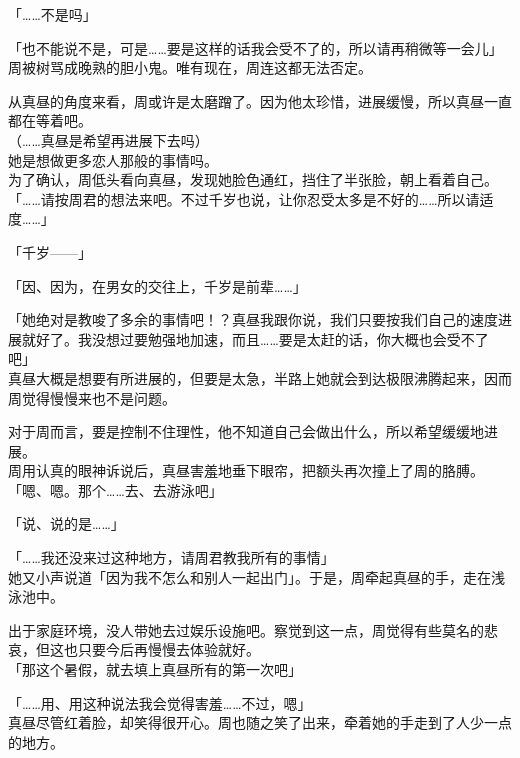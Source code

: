 「……不是吗」

「也不能说不是，可是……要是这样的话我会受不了的，所以请再稍微等一会儿」\\

周被树骂成晚熟的胆小鬼。唯有现在，周连这都无法否定。

从真昼的角度来看，周或许是太磨蹭了。因为他太珍惜，进展缓慢，所以真昼一直都在等着吧。\\

（……真昼是希望再进展下去吗）\\

她是想做更多恋人那般的事情吗。\\

为了确认，周低头看向真昼，发现她脸色通红，挡住了半张脸，朝上看着自己。\\

「……请按周君的想法来吧。不过千岁也说，让你忍受太多是不好的……所以请适度……」

「千岁——」

「因、因为，在男女的交往上，千岁是前辈……」

「她绝对是教唆了多余的事情吧！？真昼我跟你说，我们只要按我们自己的速度进展就好了。我没想过要勉强地加速，而且……要是太赶的话，你大概也会受不了吧」\\

真昼大概是想要有所进展的，但要是太急，半路上她就会到达极限沸腾起来，因而周觉得慢慢来也不是问题。

对于周而言，要是控制不住理性，他不知道自己会做出什么，所以希望缓缓地进展。\\

周用认真的眼神诉说后，真昼害羞地垂下眼帘，把额头再次撞上了周的胳膊。\\

「嗯、嗯。那个……去、去游泳吧」

「说、说的是……」

「……我还没来过这种地方，请周君教我所有的事情」\\

她又小声说道「因为我不怎么和别人一起出门」。于是，周牵起真昼的手，走在浅泳池中。

出于家庭环境，没人带她去过娱乐设施吧。察觉到这一点，周觉得有些莫名的悲哀，但这也只要今后再慢慢去体验就好。\\

「那这个暑假，就去填上真昼所有的第一次吧」

「……用、用这种说法我会觉得害羞……不过，嗯」\\

真昼尽管红着脸，却笑得很开心。周也随之笑了出来，牵着她的手走到了人少一点的地方。
